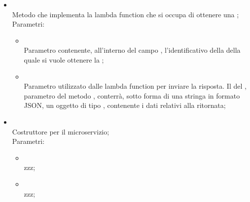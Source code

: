 \begin{itemize}
\begin{itemize}
\begin{itemize}
		\end{itemize}
		\item[]  \\
		Metodo che implementa la lambda function che si occupa di ottenere una ;\\
		Parametri:
		\begin{itemize}
			\item {} \\
			Parametro contenente, all'interno del campo , l'identificativo della  della quale si vuole ottenere la ;
			\item {} \\
			Parametro utilizzato dalle lambda function per inviare la risposta. Il  del , parametro del metodo , conterrà, sotto forma di una stringa in formato JSON, un oggetto di tipo , contenente i dati relativi alla  ritornata;
		\end{itemize}
		\item[]  \\
		Costruttore per il microservizio;\\
		Parametri:
		\begin{itemize}
			\item {} \\
			zzz;
			\item {} \\
			zzz;
		\end{itemize}
	\end{itemize}
\end{itemize}

